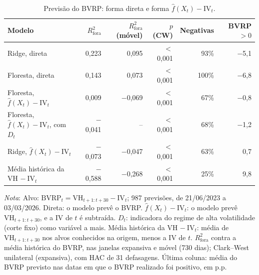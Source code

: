 \begin{table}[H]
\centering
\small
\caption{Previsão do BVRP: forma direta e forma $\hat f(X_t) - \text{IV}_t$.}
\label{tab:retnl-previsao}
\begin{tabular}{lrrrrr}
\toprule
Modelo & $R^2_{\text{fora}}$ & $R^2_{\text{fora}}$ (móvel) & $p$ (CW) & Negativas & BVRP $> 0$ \\
\midrule
Ridge, direta & 0{,}223 & 0{,}095 & $<$0{,}001 & 93\% & $-$5{,}1 \\
Floresta, direta & 0{,}143 & 0{,}073 & $<$0{,}001 & 100\% & $-$6{,}8 \\
Floresta, $\hat f(X_t) - \text{IV}_t$ & 0{,}009 & $-$0{,}069 & $<$0{,}001 & 67\% & $-$0{,}8 \\
Floresta, $\hat f(X_t) - \text{IV}_t$, com $D_t$ & $-$0{,}041 & -- & $<$0{,}001 & 68\% & $-$1{,}2 \\
Ridge, $\hat f(X_t) - \text{IV}_t$ & $-$0{,}073 & $-$0{,}047 & $<$0{,}001 & 63\% & 0{,}7 \\
Média histórica da VH $-\ \text{IV}_t$ & $-$0{,}588 & $-$0{,}268 & $<$0{,}001 & 25\% & 9{,}8 \\
\bottomrule
\end{tabular}
\par\smallskip
\parbox{0.95\linewidth}{\footnotesize\textit{Nota}: Alvo: $\text{BVRP}_t = \text{VH}_{t+1:t+30} - \text{IV}_t$; 987 previsões, de 21/06/2023 a 03/03/2026. Direta: o modelo prevê o BVRP. $\hat f(X_t) - \text{IV}_t$: o modelo prevê $\text{VH}_{t+1:t+30}$, e a IV de $t$ é subtraída. $D_t$: indicadora do regime de alta volatilidade (corte fixo) como variável a mais. Média histórica da VH $-\ \text{IV}_t$: média de $\text{VH}_{t+1:t+30}$ nos alvos conhecidos na origem, menos a IV de $t$. $R^2_{\text{fora}}$ contra a média histórica do BVRP, nas janelas expansiva e móvel (730 dias); Clark--West unilateral (expansiva), com HAC de 31 defasagens. Última coluna: média do BVRP previsto nas datas em que o BVRP realizado foi positivo, em p.p.}
\end{table}
